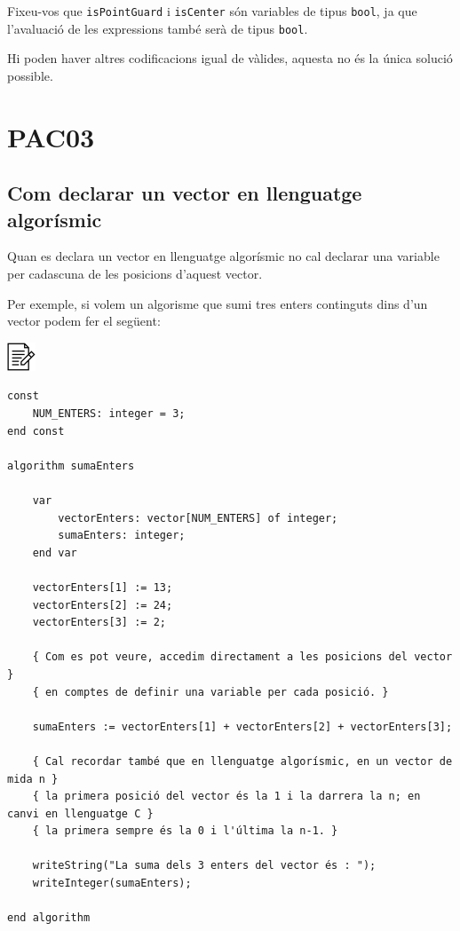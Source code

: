 \documentclass[]{book}
\begin{document}
Fixeu-vos que \texttt{isPointGuard} i \texttt{isCenter} són variables de tipus \texttt{bool}, ja que l'avaluació de les expressions també serà de tipus \texttt{bool}.

Hi poden haver altres codificacions igual de vàlides, aquesta no és la única solució possible.

\hypertarget{pac03}{%
\chapter{PAC03}\label{pac03}}

\hypertarget{com-declarar-un-vector-en-llenguatge-algorismic}{%
\section{Com declarar un vector en llenguatge algorísmic}\label{com-declarar-un-vector-en-llenguatge-algorismic}}

Quan es declara un vector en llenguatge algorísmic no cal declarar una variable per cadascuna de les posicions d'aquest vector.

Per exemple, si volem un algorisme que sumi tres enters continguts dins d'un vector podem fer el següent:

\includegraphics{./img/alg.png}

\begin{verbatim}
const
    NUM_ENTERS: integer = 3;
end const

algorithm sumaEnters

    var
        vectorEnters: vector[NUM_ENTERS] of integer;
        sumaEnters: integer;
    end var

    vectorEnters[1] := 13;
    vectorEnters[2] := 24;
    vectorEnters[3] := 2;

    { Com es pot veure, accedim directament a les posicions del vector }
    { en comptes de definir una variable per cada posició. }

    sumaEnters := vectorEnters[1] + vectorEnters[2] + vectorEnters[3];

    { Cal recordar també que en llenguatge algorísmic, en un vector de mida n }
    { la primera posició del vector és la 1 i la darrera la n; en canvi en llenguatge C }
    { la primera sempre és la 0 i l'última la n-1. }

    writeString("La suma dels 3 enters del vector és : ");
    writeInteger(sumaEnters);

end algorithm
\end{verbatim}
\end{document}
